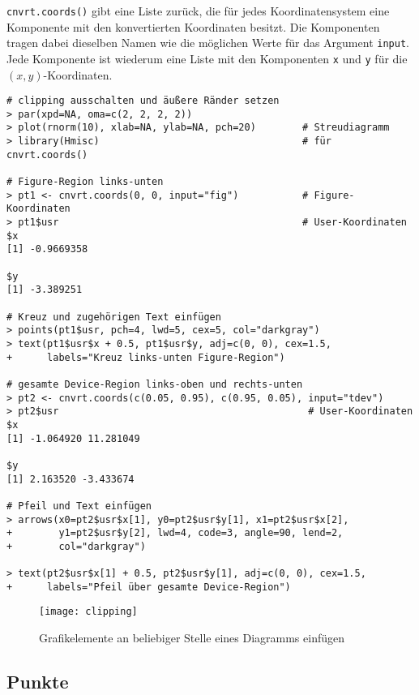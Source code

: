 \lstinline!cnvrt.coords()! gibt eine Liste zurück, die für jedes Koordinatensystem eine Komponente mit den konvertierten Koordinaten besitzt. Die Komponenten tragen dabei dieselben Namen wie die möglichen Werte für das Argument \lstinline!input!. Jede Komponente ist wiederum eine Liste mit den Komponenten \lstinline!x! und \lstinline!y! für die $(x, y)$-Koordinaten.
\begin{lstlisting}
# clipping ausschalten und äußere Ränder setzen
> par(xpd=NA, oma=c(2, 2, 2, 2))
> plot(rnorm(10), xlab=NA, ylab=NA, pch=20)        # Streudiagramm
> library(Hmisc)                                   # für cnvrt.coords()

# Figure-Region links-unten
> pt1 <- cnvrt.coords(0, 0, input="fig")           # Figure-Koordinaten
> pt1$usr                                          # User-Koordinaten
$x
[1] -0.9669358

$y
[1] -3.389251

# Kreuz und zugehörigen Text einfügen
> points(pt1$usr, pch=4, lwd=5, cex=5, col="darkgray")
> text(pt1$usr$x + 0.5, pt1$usr$y, adj=c(0, 0), cex=1.5,
+      labels="Kreuz links-unten Figure-Region")

# gesamte Device-Region links-oben und rechts-unten
> pt2 <- cnvrt.coords(c(0.05, 0.95), c(0.95, 0.05), input="tdev")
> pt2$usr                                           # User-Koordinaten
$x
[1] -1.064920 11.281049

$y
[1] 2.163520 -3.433674

# Pfeil und Text einfügen
> arrows(x0=pt2$usr$x[1], y0=pt2$usr$y[1], x1=pt2$usr$x[2],
+        y1=pt2$usr$y[2], lwd=4, code=3, angle=90, lend=2,
+        col="darkgray")

> text(pt2$usr$x[1] + 0.5, pt2$usr$y[1], adj=c(0, 0), cex=1.5,
+      labels="Pfeil über gesamte Device-Region")
\end{lstlisting}

\begin{figure}[ht]
\centering
\texttt{[image: clipping]}
\vspace*{-0.5em}
\caption{Grafikelemente an beliebiger Stelle eines Diagramms einfügen}
\label{fig:clipping}
\end{figure}

\subsection{Punkte}

